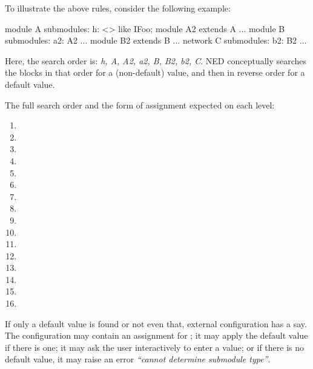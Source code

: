 To illustrate the above rules, consider the following example:

\begin{ned}
module A { submodules: h: <> like IFoo; }
module A2 extends A {...}
module B { submodules: a2: A2 {...} }
module B2 extends B {...}
network C { submodules: b2: B2 {...} }
\end{ned}

Here, the search order is: \textit{h, A, A2, a2, B, B2, b2, C}. NED
conceptually searches the  blocks in that order for a
(non-default) value, and then in reverse order for a default value.

The full search order and the form of assignment expected on each level:

\begin{enumerate}
  \item {}
  \item {}
  \item {}
  \item {}
  \item {}
  \item {}
  \item {}
  \item {}
  \item {}
  \item {}
  \item {}
  \item {}
  \item {}
  \item {}
  \item {}
  \item {}
\end{enumerate}

If only a default value is found or not even that, external configuration
has a say. The configuration may contain an assignment for
; it may apply the default value if there is one;
it may ask the user interactively to enter a value; or if there is no
default value, it may raise an error \textit{``cannot determine submodule
type''}.


